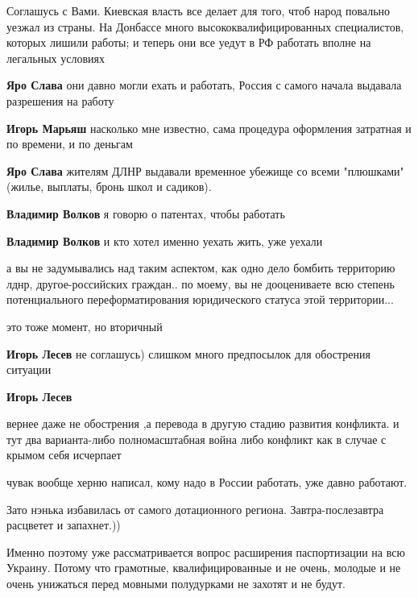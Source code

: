 \begin{itemize}

Соглашусь с Вами. Киевская власть все делает для того, чтоб народ повально
уезжал из страны. На Донбассе много высококвалифицированных специалистов,
которых лишили работы; и теперь они все уедут в РФ работать вполне на легальных
условиях

\begin{itemize} %
\textbf{Яро Слава} они давно могли ехать и работать, Россия с самого начала выдавала разрешения на работу

\textbf{Игорь Марьяш} насколько мне известно, сама процедура оформления затратная и по времени, и по деньгам

\textbf{Яро Слава} жителям ДЛНР выдавали временное убежище со всеми "плюшками" (жилье, выплаты, бронь школ и садиков).

\textbf{Владимир Волков} я говорю о патентах, чтобы работать

\textbf{Владимир Волков} и кто хотел именно уехать жить, уже уехали
\end{itemize} %


а вы не задумывались над таким аспектом, как одно дело бомбить территорию
лднр, другое-российских граждан.. по моему, вы не дооцениваете всю степень
потенциального переформатирования юридического статуса этой территории...

\begin{itemize} %
это тоже момент, но вторичный

\textbf{Игорь Лесев} не соглашусь) слишком много предпосылок для обострения ситуации

\textbf{Игорь Лесев} 

вернее даже не обострения ,а перевода в другую стадию развития конфликта. и тут
два варианта-либо полномасштабная война либо конфликт как в случае с крымом
себя исчерпает


чувак вообще херню написал, кому надо в России работать, уже давно работают.
\end{itemize} %

Зато нэнька избавилась от самого дотационного региона. Завтра-послезавтра расцветет и запахнет.))


Именно поэтому уже рассматривается вопрос расширения паспортизации на всю
Украину. Потому что грамотные, квалифицированные и не очень, молодые и не очень
унижаться перед мовными полудурками не захотят и не будут.

\end{itemize} %
